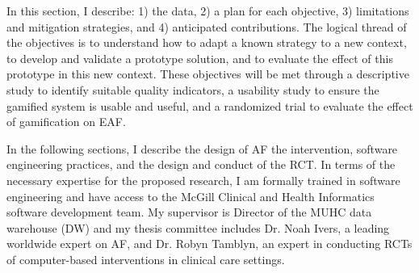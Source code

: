 In this section, I describe: 1) the data, 2) a plan for each objective, 3) limitations and  mitigation strategies, and 4) anticipated contributions. The logical thread of the objectives is to understand how to adapt a known strategy to a new context, to develop and validate a prototype solution, and to evaluate the effect of this prototype in this new context. These objectives will be met through a descriptive study to identify suitable quality indicators, a usability study to ensure the gamified system is usable and useful, and a randomized trial to evaluate the effect of gamification on \gls{EAF}.

In the following sections, I describe the design of \gls{AF} the intervention, software engineering practices, and the design and conduct of the \gls{RCT}. In terms of the necessary expertise for the proposed research, I am formally trained in software engineering and have access to the McGill Clinical and Health Informatics software development team. My supervisor is Director of the MUHC data warehouse (DW) and my thesis committee includes Dr. Noah Ivers, a leading worldwide expert on \gls{AF}, and Dr. Robyn Tamblyn, an expert in conducting \gls{RCT}s of computer-based interventions in clinical care settings.